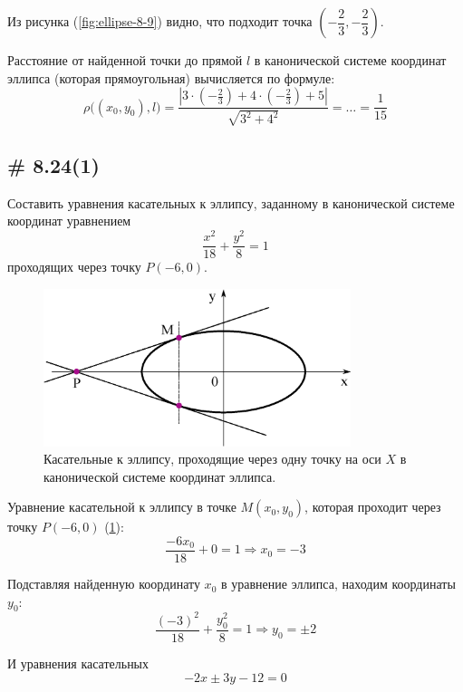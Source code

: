 \documentclass[a4paper,12pt]{article}
\begin{document}
\begin{solution}
    Из рисунка (\ref{fig:ellipse-8-9}) видно, что подходит точка $\left(-\dfrac{2}{3}, -\dfrac{2}{3}\right)$.
    
    Расстояние от найденной точки до прямой $l$ в канонической системе координат эллипса (которая прямоугольная) вычисляется по формуле:
    \[
      \rho{\bigl((x_0, y_0), l\bigr)} = \frac{\left|3 \cdot \left(-\frac{2}{3}\right) + 4 \cdot \left(-\frac{2}{3}\right) + 5\right|}{\sqrt{3^2 + 4^2}} = \ldots = \frac{1}{15}
    \]
  \end{solution}
  
  
  \subsection{\# 8.24(1)}
  
  Составить уравнения касательных к эллипсу, заданному в канонической системе координат уравнением
  \[
    \frac{x^2}{18} + \frac{y^2}{8} = 1
  \]
  проходящих через точку $P(-6, 0)$.
  
  \begin{solution}
    \begin{figure}[h]
      \centering

      \includegraphics[width=0.8\textwidth]{ellipse-8-24}
    
      \caption{Касательные к эллипсу, проходящие через одну точку на оси $X$ в канонической системе координат эллипса.}
      \label{fig:ellipse-8-24}
    \end{figure}
    
    Уравнение касательной к эллипсу в точке $M(x_0, y_0)$, которая проходит через точку $P(-6, 0)$ (\ref{fig:ellipse-8-24}):
    \[
      \frac{-6 x_0}{18} + 0 = 1 \Rightarrow x_0 = -3
    \]
    
    Подставляя найденную координату $x_0$ в уравнение эллипса, находим координаты $y_0$:
    \[
      \frac{(-3)^2}{18} + \frac{y_0^2}{8} = 1 \Rightarrow y_0 = \pm 2
    \]
    
    И уравнения касательных
    \[
      -2x \pm 3y - 12 = 0
    \]
  \end{solution}
  
\end{document}
